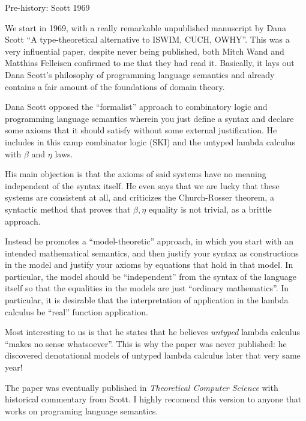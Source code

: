 \documentclass{article}
\begin{document}
\begin{section}{Pre-history: Scott 1969}

  We start in 1969, with a really remarkable unpublished manuscript by
  Dana Scott ``A type-theoretical alternative to ISWIM, CUCH, OWHY''.
  This was a very influential paper, despite never being published,
  both Mitch Wand and Matthias Felleisen confirmed to me that they had
  read it.  Basically, it lays out Dana Scott's philosophy of
  programming language semantics and already contains a fair amount of
  the foundations of domain theory.

  Dana Scott opposed the ``formalist'' approach to combinatory logic
  and programming language semantics wherein you just define a syntax
  and declare some axioms that it should satisfy without some external
  justification. He includes in this camp combinator logic (SKI) and
  the untyped lambda calculus with $\beta$ and $\eta$ laws.

  His main objection is that the axioms of said systems have no
  meaning independent of the syntax itself. He even says that we are
  lucky that these systems are consistent at all, and criticizes the
  Church-Rosser theorem, a syntactic method that proves that
  $\beta,\eta$ equality is not trivial, as a brittle approach.

  Instead he promotes a ``model-theoretic'' approach, in which you
  start with an intended mathematical semantics, and then justify your
  syntax as constructions in the model and justify your axioms by
  equations that hold in that model. In particular, the model should
  be ``independent'' from the syntax of the language itself so that
  the equalities in the models are just ``ordinary mathematics''.  In
  particular, it is desirable that the interpretation of application
  in the lambda calculus be ``real'' function application.

  Most interesting to us is that he states that he believes
  \emph{untyped} lambda calculus ``makes no sense whatsoever''.  This
  is why the paper was never published: he discovered denotational
  models of untyped lambda calculus later that very same year!

  The paper was eventually published in {\it Theoretical Computer
    Science} with historical commentary from Scott. I highly recomend
  this version to anyone that works on programing language semantics.
\end{section}
\end{document}
